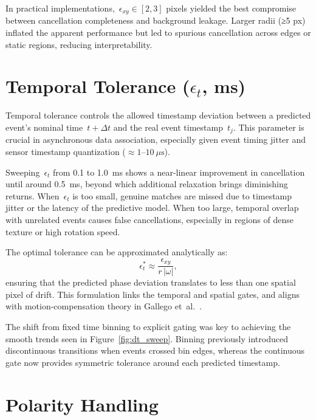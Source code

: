 In practical implementations,~\(\epsilon_{xy}\in[2,3]\) pixels yielded the best compromise between cancellation completeness and background leakage.
Larger radii (≥5 px) inflated the apparent performance but led to spurious cancellation across edges or static regions, reducing interpretability.

\section{Temporal Tolerance (\( \epsilon_{t} \), ms)}
\label{sec:temporal_tolerance}

Temporal tolerance controls the allowed timestamp deviation between a predicted event’s nominal time~\(t+\Delta t\) and the real event timestamp~\(t_j\).
This parameter is crucial in asynchronous data association, especially given event timing jitter and sensor timestamp quantization (\( \approx 1\text{--}10~\mu\text{s} \)).

Sweeping~\(\epsilon_t\) from 0.1 to 1.0~ms shows a near-linear improvement in cancellation until around 0.5~ms, beyond which additional relaxation brings diminishing returns.
When~\(\epsilon_t\) is too small, genuine matches are missed due to timestamp jitter or the latency of the predictive model.
When too large, temporal overlap with unrelated events causes false cancellations, especially in regions of dense texture or high rotation speed.

The optimal tolerance can be approximated analytically as:
\[
\epsilon_t^{*} \approx \frac{\epsilon_{xy}}{r\,|\omega|},
\]
ensuring that the predicted phase deviation translates to less than one spatial pixel of drift.
This formulation links the temporal and spatial gates, and aligns with motion-compensation theory in Gallego et~al.~\cite{Gallego2018CMax, Xu2020TCI}.

The shift from fixed time binning to explicit gating was key to achieving the smooth trends seen in Figure~\ref{fig:dt_sweep}.
Binning previously introduced discontinuous transitions when events crossed bin edges, whereas the continuous gate now provides symmetric tolerance around each predicted timestamp.

\section{Polarity Handling}
\label{sec:polarity}

